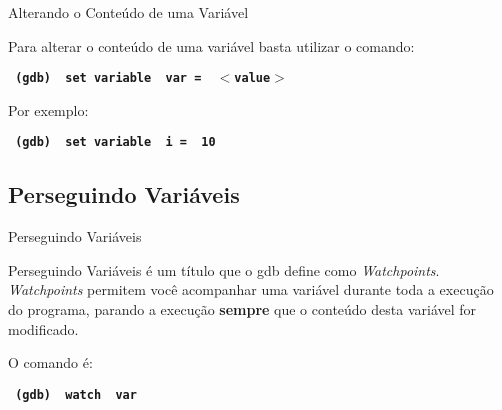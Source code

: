 \begin{frame}{Alterando o Conteúdo de uma Variável}

    Para alterar o conteúdo de uma variável basta utilizar o comando:
    
    \begin{center}
        \small
        \texttt{ \textbf{ (gdb) {\color{blue} set variable} {\color{red} var = } $<${\color{dartmouthgreen}value}$>$ }}
    \end{center}

    Por exemplo:
    
    \begin{center}
        \small
        \texttt{ \textbf{ (gdb) {\color{blue} set variable} {\color{red} i = } {\color{dartmouthgreen}10} }}
    \end{center}
    
\end{frame}

\subsection{ Perseguindo Variáveis }
\frame{\tableofcontents[
    currentsection,
    currentsubsection,
    subsectionstyle=show/shaded/hide
]}
\begin{frame}{Perseguindo Variáveis}

    Perseguindo Variáveis é um título que o gdb define como \textit{Watchpoints}. \textit{Watchpoints} permitem você acompanhar uma variável durante toda a execução do programa, parando a execução \textbf{sempre} que o conteúdo desta variável for modificado.
    
    O comando é:
    
    \begin{center}
        \small
        \texttt{ \textbf{ (gdb) {\color{blue} watch} {\color{red} var} } }
    \end{center}

\end{frame}

